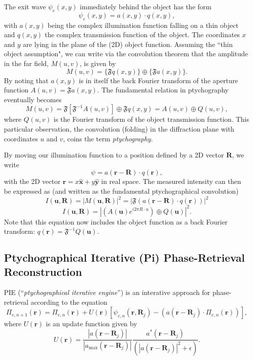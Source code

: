 \documentclass{article}
\begin{document}
The exit wave $\psi_e(x,y)$ immediately behind the object has the form
\begin{equation}
    \psi_e(x,y)=a(x,y)\cdot q(x,y),
\end{equation}
with $a(x,y)$ being the complex illumination function falling on a thin object and $q(x,y)$ the complex transmission function of the object.
The coordinates $x$ and $y$ are lying in the plane of the (2D) object function.
Assuming the ``thin object assumption", we can write via the convolution theorem that the  amplitude in the far field, $M(u,v)$, is given by
\begin{equation}
    M(u,v)=\{\mathfrak{F}q(x,y)\} \oplus \{\mathfrak{F}a(x,y)\}.
\end{equation}
By noting that $a(x,y)$ is in itself the back Fourier transform of the aperture function $A(u,v) = \mathfrak{F}a(x,y)$. The fundamental relation in ptychography eventually becomes
\begin{equation}
    M(u,v)=\mathfrak{F}[\mathfrak{F}^{-1} A(u,v)] \oplus \mathfrak{F}q(x,y) = A(u,v) \oplus Q(u,v),
\end{equation}
where $Q(u,v)$ is the Fourier transform of the object transmission function. This particular observation, the convolution (folding) in the diffraction plane with coordinates $u$ and $v$, coins the term \textit{ptychography}.

By moving our illumination function to a position defined by a 2D vector $\bm{R}$, we write 
\begin{equation}
    \psi=a(\bm{r}-\bm{R})\cdot q(\bm{r}),
\end{equation}
with the 2D vector $\bm{r}=x\bm{\hat{x}}+ y\bm{\hat{y}}$ in real space. The measured intensity can then be expressed as (and written as the fundamental ptychographical convolution)
\begin{equation}
    I(\bm{u}, \bm{R}) = |M(\bm{u},\bm{R})|^2 = |\mathfrak{F}(a(\bm{r}-\bm{R})\cdot q(\bm{r}))|^2
\end{equation}
\begin{equation}
    I(\bm{u}, \bm{R}) = |(A(\bm{u})e^{i2\pi R\cdot u})\oplus Q(\bm{u})|^2.
\end{equation}
Note that this equation now includes the object function as a back Fourier transform: $q(\bm{r}) = \mathfrak{F}^{-1}Q(\bm{u})$.

\subsection{Ptychographical Iterative (Pi) Phase-Retrieval Reconstruction}
PIE (``\textit{ptychographical iterative engine}'') is an interative approach for phase-retrieval according to the equation
\begin{equation}
    \Pi_{e,n+1}(\bm{r}) = \Pi_{e,n}(\bm{r})+U(\bm{r})[\psi_{c,n}(\bm{r},\bm{R}_j) - (a(\bm{r}-\bm{R}_j) \cdot \Pi_{e,n}(\bm{r})) ],
\end{equation}
where $U(\bm{r})$ is an update function given by
\begin{equation}
    U(\bm{r})=\frac{|a(\bm{r}-\bm{R}_j)|}{|a_\mathrm{max}(\bm{r}-\bm{R}_j)|}\frac{a^*(\bm{r}-\bm{R}_j)}{(|a(\bm{r}-\bm{R}_j)|^2 + \epsilon) }.
\end{equation}
\end{document}
